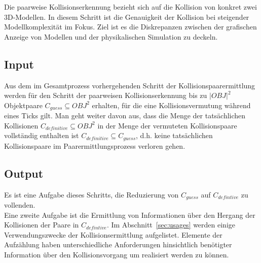 \label{sec:l2}
Die paarweise Kollisionserkennung bezieht sich auf die Kollision von konkret zwei 3D-Modellen. In diesem Schritt ist die Genauigkeit der Kollision bei steigender Modellkomplexität im Fokus.
Ziel ist es die Diskrepanzen zwischen der grafischen Anzeige von Modellen und der physikalischen Simulation zu deckeln.
\subsection{Input}
Aus dem im Gesamtprozess vorhergehenden Schritt der Kollisionspaarermittlung werden für den Schritt der paarweisen Kollisionserkennung bis zu  $|OBJ|^2$ Objektpaare $C_{guess}\subseteq OBJ^2$ erhalten, für die eine Kollisionsvermutung während eines Ticks gilt. Man geht weiter davon aus, dass die Menge der tatsächlichen Kollisionen $C_{definitive}\subseteq OBJ^2$ in der Menge der vermuteten Kollisionspaare  vollständig enthalten ist $C_{definitive}\subseteq C_{guess}$, d.h. keine tatsächlichen Kollisionspaare im Paarermittlungsprozess verloren gehen. 

\subsection{Output}
Es ist eine Aufgabe dieses Schritts, die Reduzierung von $C_{guess}$ auf $C_{defintive}$ zu vollenden.\\
Eine zweite Aufgabe ist die Ermittlung von Informationen über den Hergang der Kollisionen der Paare in $C_{defintive}$.
Im Abschnitt~\ref{sec:usages} werden einige Verwendungszwecke der Kollisionsermittlung aufgelistet. 
Elemente der Aufzählung haben unterschiedliche Anforderungen hinsichtlich benötigter Information über den Kollisionsvorgang um realisiert werden zu können.

